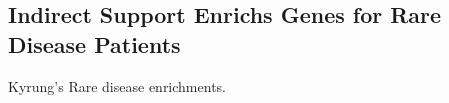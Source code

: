 \subsection{Indirect Support Enrichs Genes for Rare Disease Patients}

Kyrung's Rare disease enrichments. 
